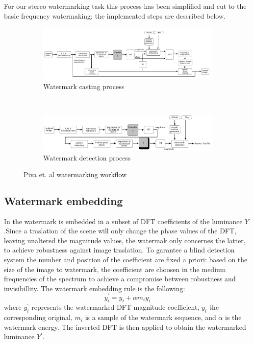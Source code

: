 For our stereo watermarking task this process has been simplified and cut to the basic frequency watermaking; the implemented steps are described below.

\begin{figure}[h!]
\centering
\begin{subfigure}[]{\textwidth}
\centering
\includegraphics[width=1\textwidth]{./img/casting.png}
\caption{\scriptsize{Watermark casting process}\label{fig:cast}}
\end{subfigure} 
~\quad
\begin{subfigure}[]{\textwidth}
\centering
\includegraphics[width=1\textwidth]{./img/detection.png}
\caption{\scriptsize{Watermark detection process}\label{fig:det}}
\end{subfigure}%
\caption{\small{Piva et. al watermarking workflow}\label{fig:blocchi}}
\end{figure}

\subsection{Watermark embedding} 
\label{wat_emb}

In \cite{PIVA} the watermark is embedded in a subset of DFT coefficients of the luminance $Y$.\newline Since a traslation of the scene will only change the phase values of the DFT, leaving unaltered the magnitude values, the watermak only concernes the latter, to achieve robustness against image traslation.\newline
To garantee a blind detection system the number and position of the coefficient are fixed a priori: based on the size of the image to watermark, the coefficient are choosen in the medium frequencies of the spectrum to achieve a compromise between robustness and invisibillity.\newline 
The watermark embedding rule is the following:
$$y_{i}^{'} = y_{i}+\alpha m_{i}y_{i} $$
where $y_{i}^{'}$ represents the watermarked DFT magnitude coefficient, $y_{i}$ the corresponding original, $m_{i}$ is a sample of the watermark sequence, and $\alpha$ is the watermark energy.\newline
The inverted DFT is then applied to obtain the watermarked luminance $Y^{'}$.

